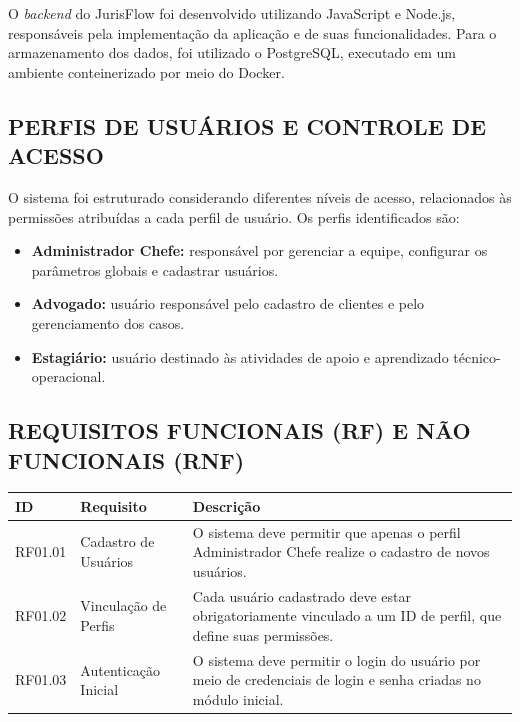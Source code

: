 O \textit{backend} do JurisFlow foi desenvolvido utilizando JavaScript e Node.js,
responsáveis pela implementação da aplicação e de suas funcionalidades. Para o
armazenamento dos dados, foi utilizado o PostgreSQL, executado em um ambiente
conteinerizado por meio do Docker.

\subsection{PERFIS DE USUÁRIOS E CONTROLE DE ACESSO}

O sistema foi estruturado considerando diferentes níveis de acesso, relacionados
às permissões atribuídas a cada perfil de usuário. Os perfis identificados são:

\begin{itemize}
  \item \textbf{Administrador Chefe:} responsável por gerenciar a equipe,
        configurar os parâmetros globais e cadastrar usuários.
  \item \textbf{Advogado:} usuário responsável pelo cadastro de clientes e pelo
        gerenciamento dos casos.
  \item \textbf{Estagiário:} usuário destinado às atividades de apoio e
        aprendizado técnico-operacional.
\end{itemize}

\subsection{REQUISITOS FUNCIONAIS (RF) E NÃO FUNCIONAIS (RNF)}

\begin{quadro}[H]
\centering
\caption{Requisitos Funcionais - Módulo 01: Cadastro de Usuários e Perfis}
\label{qua:rf-modulo01}
\renewcommand{\arraystretch}{1.3}
\begin{tabularx}{\textwidth}{|l|l|X|}
\hline
\textbf{ID} & \textbf{Requisito} & \textbf{Descrição} \\
\hline
RF01.01 & Cadastro de Usuários & O sistema deve permitir que apenas o perfil Administrador Chefe realize o cadastro de novos usuários. \\
\hline
RF01.02 & Vinculação de Perfis & Cada usuário cadastrado deve estar obrigatoriamente vinculado a um ID de perfil, que define suas permissões. \\
\hline
RF01.03 & Autenticação Inicial & O sistema deve permitir o login do usuário por meio de credenciais de login e senha criadas no módulo inicial. \\
\hline
\end{tabularx}
\end{quadro}

